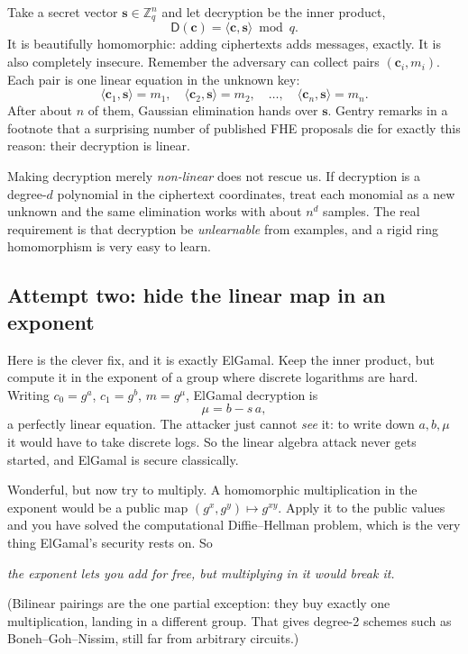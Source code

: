 \documentclass[11pt,a4paper]{article}
\newcommand{\ZZ}{\mathbb{Z}}
\newcommand{\Zq}{\ZZ_q}
\newcommand{\Dec}{\mathsf{D}}
\renewcommand{\vec}[1]{\bm{#1}}
\newcommand{\inner}[2]{\langle #1,#2\rangle}
\begin{document}
Take a secret vector $\vec s\in\Zq^n$ and let decryption be the inner
product,
\[
\Dec(\vec c)=\inner{\vec c}{\vec s}\bmod q .
\]
It is beautifully homomorphic: adding ciphertexts adds messages, exactly. It
is also completely insecure. Remember the adversary can collect pairs
$(\vec c_i,m_i)$. Each pair is one linear equation in the unknown key:
\[
\inner{\vec c_1}{\vec s}=m_1,\quad \inner{\vec c_2}{\vec s}=m_2,\quad\dots,\quad \inner{\vec c_n}{\vec s}=m_n .
\]
After about $n$ of them, Gaussian elimination hands over $\vec s$. Gentry
remarks in a footnote that a surprising number of published FHE proposals
die for exactly this reason: their decryption is linear.

\begin{aside}
Making decryption merely \emph{non-linear} does not rescue us. If decryption
is a degree-$d$ polynomial in the ciphertext coordinates, treat each monomial
as a new unknown and the same elimination works with about $n^d$ samples.
The real requirement is that decryption be \emph{unlearnable} from examples,
and a rigid ring homomorphism is very easy to learn.
\end{aside}

\subsection{Attempt two: hide the linear map in an exponent}

Here is the clever fix, and it is exactly ElGamal. Keep the inner product, but
compute it in the exponent of a group where discrete logarithms are hard.
Writing $c_0=g^a$, $c_1=g^b$, $m=g^\mu$, ElGamal decryption is
\[
\mu=b-s\,a,
\]
a perfectly linear equation. The attacker just cannot \emph{see} it: to
write down $a,b,\mu$ it would have to take discrete logs. So the linear
algebra attack never gets started, and ElGamal is secure classically.

Wonderful, but now try to multiply. A homomorphic multiplication in the
exponent would be a public map $(g^x,g^y)\mapsto g^{xy}$. Apply it to the
public values and you have solved the computational Diffie--Hellman problem,
which is the very thing ElGamal's security rests on. So
\begin{center}
\emph{the exponent lets you add for free, but multiplying in it would break it.}
\end{center}
(Bilinear pairings are the one partial exception: they buy exactly one
multiplication, landing in a different group. That gives degree-2 schemes
such as Boneh--Goh--Nissim, still far from arbitrary circuits.)
\end{document}
